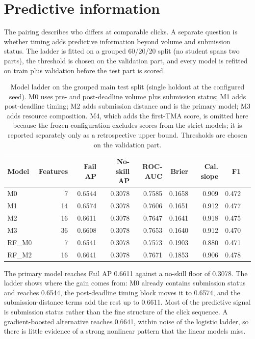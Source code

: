 \documentclass[11pt]{article}
\begin{document}
\section{Predictive information}
The pairing describes who differs at comparable clicks. A separate question is whether timing adds predictive information beyond volume and submission status. The ladder is fitted on a grouped 60/20/20 split (no student spans two parts), the threshold is chosen on the validation part, and every model is refitted on train plus validation before the test part is scored.
\begin{table}[t]
\centering
\footnotesize\setlength{\tabcolsep}{3pt}
\begin{tabular}{lrrrrrrrr}
\toprule
Model & Features & Fail AP & No-skill AP & ROC-AUC & Brier & Cal. slope & F1 \\
\midrule
M0 & 7 & 0.6544 & 0.3078 & 0.7585 & 0.1658 & 0.909 & 0.472 \\
M1 & 14 & 0.6574 & 0.3078 & 0.7606 & 0.1651 & 0.912 & 0.477 \\
M2 & 16 & 0.6611 & 0.3078 & 0.7647 & 0.1641 & 0.918 & 0.475 \\
M3 & 36 & 0.6608 & 0.3078 & 0.7653 & 0.1640 & 0.912 & 0.470 \\
RF\_M0 & 7 & 0.6541 & 0.3078 & 0.7573 & 0.1903 & 0.880 & 0.471 \\
RF\_M2 & 16 & 0.6641 & 0.3078 & 0.7671 & 0.1853 & 0.906 & 0.478 \\
\bottomrule
\end{tabular}
\caption{Model ladder on the grouped main test split (single holdout at the configured seed). M0 uses pre- and post-deadline volume plus submission status; M1 adds post-deadline timing; M2 adds submission distance and is the primary model; M3 adds resource composition. M4, which adds the first-TMA score, is omitted here because the frozen configuration excludes scores from the strict models; it is reported separately only as a retrospective upper bound. Thresholds are chosen on the validation part.}
\label{tab:models}
\end{table}
The primary model reaches Fail AP 0.6611 against a no-skill floor of 0.3078. The ladder shows where the gain comes from: M0 already contains submission status and reaches 0.6544, the post-deadline timing block moves it to 0.6574, and the submission-distance terms add the rest up to 0.6611. Most of the predictive signal is submission status rather than the fine structure of the click sequence. A gradient-boosted alternative reaches 0.6641, within noise of the logistic ladder, so there is little evidence of a strong nonlinear pattern that the linear models miss.
\end{document}
